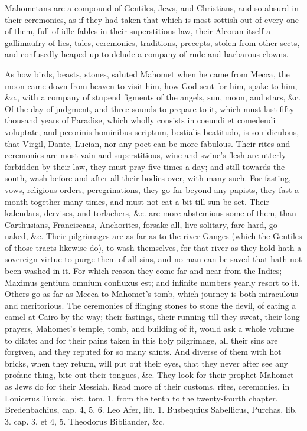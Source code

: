 {Mahometans are a compound of Gentiles, Jews, and Christians, and so
absurd in their ceremonies, as if they had taken that which is most
sottish out of every one of them, full of idle fables in their
superstitious law, their Alcoran itself a gallimaufry of lies, tales,
ceremonies, traditions, precepts, stolen from other sects, and
confusedly heaped up to delude a company of rude and barbarous clowns.

As how birds, beasts, stones, saluted Mahomet when he came from Mecca,
the moon came down from heaven to visit him, how God sent for
him, spake to him, \&c., with a company of stupend figments of the
angels, sun, moon, and stars, \&c. Of the day of judgment, and three
sounds to prepare to it, which must last fifty thousand years of
Paradise, which wholly consists in coeundi et comedendi voluptate, and
pecorinis hominibus scriptum, bestialis beatitudo, is so ridiculous,
that Virgil, Dante, Lucian, nor any poet can be more fabulous. Their
rites and ceremonies are most vain and superstitious, wine and swine's
flesh are utterly forbidden by their law, they must pray five
times a day; and still towards the south, wash before and after all
their bodies over, with many such. For fasting, vows, religious orders,
peregrinations, they go far beyond any papists, they fast a month
together many times, and must not eat a bit till sun be set. Their
kalendars, dervises, and torlachers, \&c. are more abstemious some
of them, than Carthusians, Franciscans, Anchorites, forsake all, live
solitary, fare hard, go naked, \&c. Their pilgrimages are as far
as to the river Ganges (which the Gentiles of those tracts
likewise do), to wash themselves, for that river as they hold hath a
sovereign virtue to purge them of all sins, and no man can be saved
that hath not been washed in it. For which reason they come far and
near from the Indies; Maximus gentium omnium confluxus est; and
infinite numbers yearly resort to it. Others go as far as Mecca to
Mahomet's tomb, which journey is both miraculous and meritorious. The
ceremonies of flinging stones to stone the devil, of eating a camel at
Cairo by the way; their fastings, their running till they sweat, their
long prayers, Mahomet's temple, tomb, and building of it, would ask a
whole volume to dilate: and for their pains taken in this holy
pilgrimage, all their sins are forgiven, and they reputed for so many
saints. And diverse of them with hot bricks, when they return, will put
out their eyes, that they never after see any profane thing, bite
out their tongues, \&c. They look for their prophet Mahomet as Jews do
for their Messiah. Read more of their customs, rites, ceremonies, in
Lonicerus Turcic. hist. tom. 1. from the tenth to the twenty-fourth
chapter. Bredenbachius, cap. 4, 5, 6. Leo Afer, lib. 1. Busbequius
Sabellicus, Purchas, lib. 3. cap. 3, et 4, 5. Theodorus Bibliander, \&c.

}
